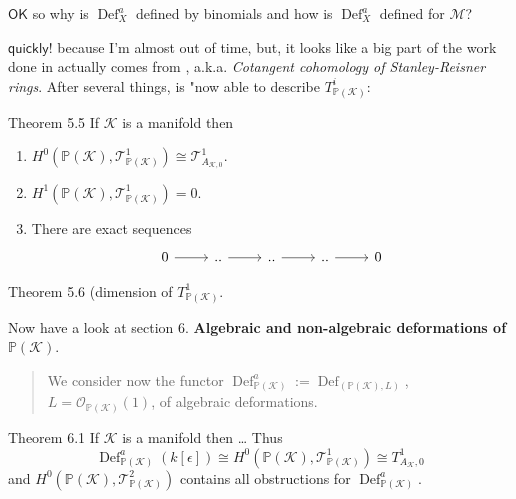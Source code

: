 {\color{8}$\mathsf{OK}$ so why is $\operatorname{Def}^a_{X}$ defined by binomials and how is $\operatorname{Def}^a_X$ defined for $\mathcal{M}$?}

$\mathsf{quickly!}$ because I'm almost out of time, but, it looks like a big part of the work done in \cite{jan2} actually comes from \cite{jan3}, a.k.a. \textit{Cotangent cohomology of Stanley-Reisner rings}. After several things, \cite{jan2} is "now able to describe $T^i_{\mathbb{P}(\mathcal{K})}$:

\begin{thing4}{Theorem 5.5}\leavevmode
	If $\mathcal{K}$ is a manifold then
	\begin{enumerate}[label=(\roman*)]
		\item $H^{0}(\mathbb{P}(\mathcal{K}),\mathcal{T}^1_{\mathbb{P}(\mathcal{K})})\cong \mathcal{T}^1_{A_{\mathcal{K},0}}$.
		\item $H^{1}(\mathbb{P}(\mathcal{K}),\mathcal{T}^1_{\mathbb{P}(\mathcal{K})})=0$.
		\item There are exact sequences
			\[\begin{tikzcd}
				0\arrow[r]&..\arrow[r]&..\arrow[r]&..\arrow[r]&0
			\end{tikzcd}\]
	\end{enumerate}
\end{thing4}

\begin{thing3}{Theorem 5.6}\leavevmode
	(dimension of $T^1_{\mathbb{P}(\mathcal{K})}$.
\end{thing3}

Now have a look at section 6. \textbf{Algebraic and non-algebraic deformations of $\mathbb{P}(\mathcal{K})$}.

{\color{4}\begin{quotation}
		We consider now the functor $\operatorname{Def}^a_{\mathbb{P}(\mathcal{K})}:=\operatorname{Def}_{(\mathbb{P}(\mathcal{K}),L)}$, $L=\mathcal{O}_{\mathbb{P}(\mathcal{K})}(1)$, of algebraic deformations.
\end{quotation}}

\begin{thing2}{Theorem 6.1}\leavevmode 
	If $\mathcal{K}$ is a manifold then … Thus
\[\operatorname{Def}^a_{\mathbb{P}(\mathcal{K})}(k[\epsilon ])\cong H^{0}(\mathbb{P}(\mathcal{K}),\mathcal{T}^1_{\mathbb{P}(\mathcal{K})})\cong T^1_{A_{\mathcal{K}},0}\]
and $H^{0}(\mathbb{P}(\mathcal{K}), \mathcal{T}^2_{\mathbb{P}(\mathcal{K})}) $ contains all obstructions for $\operatorname{Def}^a_{\mathbb{P}(\mathcal{K})}$.
\end{thing2}

